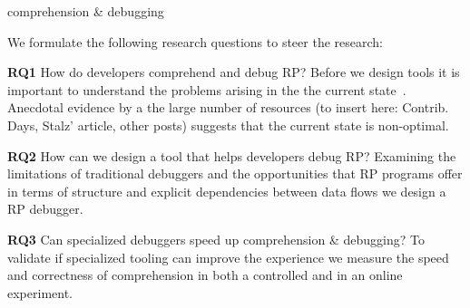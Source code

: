 {\color{red}comprehension \& debugging}

We formulate the following research questions to steer the research: 

\textbf{RQ1} How do developers comprehend and debug RP? \linebreak
Before we design tools it is important to understand the problems arising in the the current state~\cite{singer2010examination}. Anecdotal evidence by a the large number of resources (to insert here: Contrib. Days, Stalz' article, other posts) suggests that the current state is non-optimal.

%

\textbf{RQ2} How can we design a tool that helps developers debug RP? \linebreak
Examining the limitations of traditional debuggers and the opportunities that RP programs offer in terms of structure and explicit dependencies between data flows we design a RP debugger.


\textbf{RQ3} Can specialized debuggers speed up comprehension \& debugging?\linebreak
To validate if specialized tooling can improve the experience we measure the speed and correctness of comprehension in both a controlled and in an online experiment.


